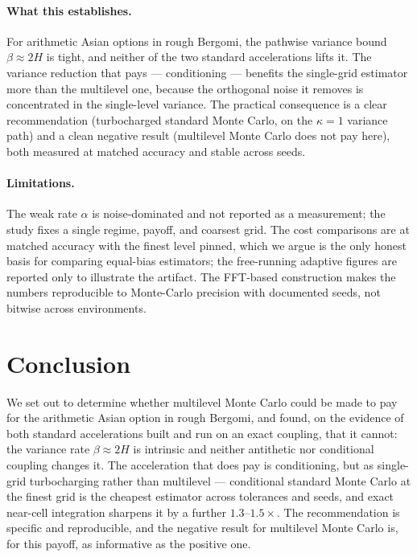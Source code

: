 \documentclass[11pt]{article}
\begin{document}
\paragraph{What this establishes.} For arithmetic Asian options in rough Bergomi, the pathwise
variance bound $\beta\approx2H$ is tight, and neither of the two standard accelerations lifts
it. The variance reduction that pays --- conditioning --- benefits the single-grid estimator
more than the multilevel one, because the orthogonal noise it removes is concentrated in the
single-level variance. The practical consequence is a clear recommendation (turbocharged
standard Monte Carlo, on the $\kappa=1$ variance path) and a clean negative result (multilevel
Monte Carlo does not pay here), both measured at matched accuracy and stable across seeds.

\paragraph{Limitations.} The weak rate $\alpha$ is noise-dominated and not reported as a
measurement; the study fixes a single regime, payoff, and coarsest grid. The cost comparisons
are at matched accuracy with the finest level pinned, which we argue is the only honest basis
for comparing equal-bias estimators; the free-running adaptive figures are reported only to
illustrate the artifact. The FFT-based construction makes the numbers reproducible to
Monte-Carlo precision with documented seeds, not bitwise across environments.

\section{Conclusion}
\label{sec:conclusion}

We set out to determine whether multilevel Monte Carlo could be made to pay for the arithmetic
Asian option in rough Bergomi, and found, on the evidence of both standard accelerations built
and run on an exact coupling, that it cannot: the variance rate $\beta\approx2H$ is intrinsic
and neither antithetic nor conditional coupling changes it. The acceleration that does pay is
conditioning, but as single-grid turbocharging rather than multilevel --- conditional standard
Monte Carlo at the finest grid is the cheapest estimator across tolerances and seeds, and
exact near-cell integration sharpens it by a further $1.3$--$1.5\times$. The recommendation is
specific and reproducible, and the negative result for multilevel Monte Carlo is, for this
payoff, as informative as the positive one.
\end{document}
